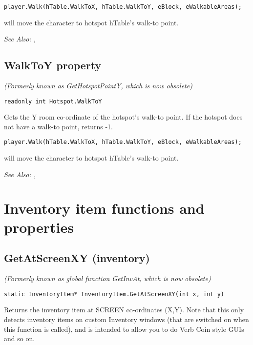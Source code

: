 \begin{verbatim}
player.Walk(hTable.WalkToX, hTable.WalkToY, eBlock, eWalkableAreas);
\end{verbatim}
will move the character to hotspot hTable's walk-to point.

\it{See Also:} ,


\subsection{WalkToY property}\label{Hotspot.WalkToY}%

\it{(Formerly known as GetHotspotPointY, which is now obsolete)}

\begin{verbatim}
readonly int Hotspot.WalkToY
\end{verbatim}
Gets the Y room co-ordinate of the hotspot's walk-to point. If the hotspot
does not have a walk-to point, returns -1.

\begin{verbatim}
player.Walk(hTable.WalkToX, hTable.WalkToY, eBlock, eWalkableAreas);
\end{verbatim}
will move the character to hotspot hTable's walk-to point.

\it{See Also:} ,



\section{Inventory item functions and properties}%


\subsection{GetAtScreenXY (inventory)}\label{InventoryItem.GetAtScreenXY}%

\it{(Formerly known as global function GetInvAt, which is now obsolete)}

\begin{verbatim}
static InventoryItem* InventoryItem.GetAtScreenXY(int x, int y)
\end{verbatim}
Returns the inventory item at SCREEN co-ordinates (X,Y). Note that this
only detects inventory items on custom Inventory windows (that are switched on when
this function is called), and is intended to allow you to do Verb Coin style GUIs and so on.

